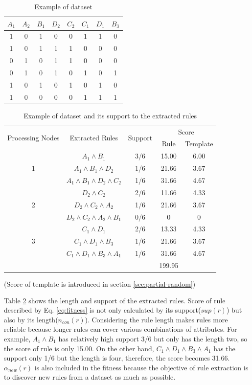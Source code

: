 \documentclass{elsart}
\begin{document}
\begin{table}[tb]
\caption{\label{dataset-support1}Example of dataset}
\begin{flushleft}
\begin{tabular}{|c|c|c|c|c|c|c|c|}
\hline 
$A_{1}$ & $A_{2}$ & $B_{1}$ & $D_{2}$ & $C_{2}$ & $C_{1}$ & $D_{1}$ & $B_{3}$\tabularnewline
\hline 
1 & 0 & 1 & 0 & 0 & 1 & 1 & 0\tabularnewline
\hline 
1 & 0 & 1 & 1 & 1 & 0 & 0 & 0\tabularnewline
\hline 
0 & 1 & 0 & 1 & 1 & 0 & 0 & 0\tabularnewline
\hline 
0 & 1 & 0 & 1 & 0 & 1 & 0 & 1\tabularnewline
\hline 
1 & 0 & 1 & 0 & 1 & 0 & 1 & 0\tabularnewline
\hline 
1 & 0 & 0 & 0 & 0 & 1 & 1 & 1\tabularnewline
\hline 
\end{tabular}
\end{flushleft}
\end{table}

\begin{table}[tb]
\caption{\label{dataset-support2}Example of dataset and its support to the extracted rules}
\begin{flushleft}
\begin{tabular}{|c|c|c|c|c|}
\hline 
\multirow{2}{*}{Processing Nodes} & \multirow{2}{*}{Extracted Rules} & \multirow{2}{*}{Support} & \multicolumn{2}{c|}{Score}\tabularnewline
\cline{4-5} 
 &  &  & Rule & Template\tabularnewline
\hline 
\multirow{3}{*}{1} & $A_{1}\wedge B_{1}$ & 3/6 & 15.00 & 6.00\tabularnewline
\cline{2-5} 
 & $A_{1}\wedge B_{1}\wedge D_{2}$ & 1/6 & 21.66 & 3.67\tabularnewline
\cline{2-5} 
 & $A_{1}\wedge B_{1}\wedge D_{2}\wedge C_{2}$ & 1/6 & 31.66 & 4.67\tabularnewline
\hline 
\multirow{3}{*}{2} & $D_{2}\wedge C_{2}$ & 2/6 & 11.66 & 4.33\tabularnewline
\cline{2-5} 
 & $D_{2}\wedge C_{2}\wedge A_{2}$ & 1/6 & 21.66 & 3.67\tabularnewline
\cline{2-5} 
 & $D_{2}\wedge C_{2}\wedge A_{2}\wedge B_{1}$ & 0/6 & 0 & 0\tabularnewline
\hline 
\multirow{3}{*}{3} & $C_{1}\wedge D_{1}$ & 2/6 & 13.33 & 4.33\tabularnewline
\cline{2-5} 
 & $C_{1}\wedge D_{1}\wedge B_{3}$ & 1/6 & 21.66 & 3.67\tabularnewline
\cline{2-5} 
 & $C_{1}\wedge D_{1}\wedge B_{3}\wedge A_{1}$ & 1/6 & 31.66 & 4.67\tabularnewline
\hline 
\multicolumn{3}{|c|}{} & 199.95 & \tabularnewline
\hline 
\end{tabular}
\end{flushleft}
(Score of template is introduced in section \ref{sec:partial-random})
\end{table}

Table \ref{dataset-support2} shows the length and support of the extracted rules. Score of rule described by Eq. \ref{eq:fitness} is not only calculated by its support($sup(r)$) but also by its length($n_{con}(r)$). Considering the rule length makes rules more reliable because longer rules can cover various combinations of attributes. For example, $A_{1}\wedge B_{1}$ has relatively high support 3/6 but only has the length two, so the score of rule is only 15.00. On the other hand, $C_{1}\wedge D_{1}\wedge B_{3}\wedge A_{1}$ has the support only 1/6 but the length is four, therefore, the score becomes 31.66. $\alpha_{new}(r)$ is also included in the fitness because the objective of rule extraction is to discover new rules from a dataset as much as possible.
\end{document}
